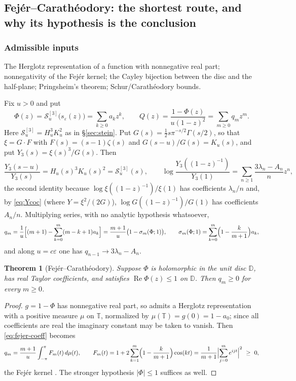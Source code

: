 \documentclass[11pt]{amsart}
\newtheorem{theorem}{Theorem}[section]
\theoremstyle{definition}
\theoremstyle{remark}
\theoremstyle{definition}
\renewcommand{\Re}{\operatorname{Re}}
\newcommand{\half}{\tfrac{1}{2}}
\newcommand{\eps}{\varepsilon}
\newcommand{\Dd}{\mathbb{D}}
\newcommand{\Tt}{\mathbb{T}}
\begin{document}
\subsection{Fej\'er--Carath\'eodory: the shortest route, and why its hypothesis is the
conclusion}\label{sec:fejer}

\subsubsection*{Admissible inputs}
The Herglotz representation of a function with nonnegative real part; nonnegativity of the Fej\'er
kernel; the Cayley bijection between the disc and the half-plane; Pringsheim's theorem;
Schur/Carath\'eodory bounds.

Fix $u>0$ and put
\begin{equation}\label{eq:Phi}
   \Phi(z)=\mathcal S_u^{[3]}\bigl(s_\eps(z)\bigr)=\sum_{k\ge0}a_kz^k,
   \qquad
   Q(z)=\frac{1-\Phi(z)}{u(1-z)^2}=\sum_{m\ge0}q_mz^m .
\end{equation}
Here $\mathcal S_u^{[3]}=H_u^3K_u^2$ as in \S\ref{sec:stein}. Put $G(s)=\half s\pi^{-s/2}\Gamma(s/2)$, so
that $\xi=G\cdot F$ with $F(s)=(s-1)\zeta(s)$ and $G(s-u)/G(s)=K_u(s)$, and put
$Y_3(s)=\xi(s)^3/G(s)$. Then
\[
   \frac{Y_3(s-u)}{Y_3(s)}=H_u(s)^3K_u(s)^2=\mathcal S_u^{[3]}(s),\qquad
   \log\frac{Y_3((1-z)^{-1})}{Y_3(1)}=\sum_{n\ge1}\frac{3\lambda_n-A_n}{n}z^n ,
\]
the second identity because $\log\xi((1-z)^{-1})/\xi(1)$ has coefficients $\lambda_n/n$ and, by
\eqref{eq:Ycoc} (where $Y=\xi^2/(2G)$), $\log G((1-z)^{-1})/G(1)$ has coefficients $A_n/n$.
Multiplying series, with no analytic hypothesis whatsoever,
\begin{equation}\label{eq:fejer-coeff}
   q_m=\frac1u\Bigl[(m+1)-\sum_{k=0}^m(m-k+1)a_k\Bigr]
   =\frac{m+1}{u}\bigl(1-\sigma_m(\Phi;1)\bigr),
   \qquad
   \sigma_m(\Phi;1)=\sum_{k=0}^m\Bigl(1-\frac{k}{m+1}\Bigr)a_k ,
\end{equation}
and along $u=c\eps$ one has $q_{n-1}\to3\lambda_n-A_n$.

\begin{theorem}[Fej\'er--Carath\'eodory]\label{thm:fejer}
Suppose $\Phi$ is holomorphic in the unit disc $\Dd$, has real Taylor coefficients, and satisfies
$\Re\Phi(z)\le1$ on $\Dd$. Then $q_m\ge0$ for every $m\ge0$.
\end{theorem}

\begin{proof}
$g=1-\Phi$ has nonnegative real part, so admits a Herglotz representation with a positive measure
$\mu$ on $\Tt$, normalized by $\mu(\Tt)=g(0)=1-a_0$; since all coefficients are real the
imaginary constant may be taken to vanish. Then \eqref{eq:fejer-coeff} becomes
\[
   q_m=\frac{m+1}{u}\int_{-\pi}^{\pi}F_m(t)\,d\mu(t),
   \qquad
   F_m(t)=1+2\sum_{k=1}^m\Bigl(1-\frac{k}{m+1}\Bigr)\cos(kt)
   =\frac{1}{m+1}\Bigl|\sum_{j=0}^me^{ijt}\Bigr|^2\ \ge\ 0 ,
\]
the Fej\'er kernel \cite{Fejer}. The stronger hypothesis $|\Phi|\le1$ suffices as well.
\end{proof}
\end{document}
